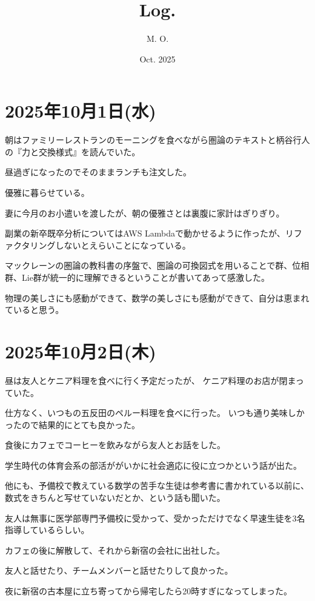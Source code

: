 \documentclass[uplatex]{jsarticle}
\title{
Log.
}
\author{
M. O.
}
\date{Oct. 2025}
\begin{document}
\maketitle

\section{2025年10月1日(水)}

朝はファミリーレストランのモーニングを食べながら圏論のテキストと柄谷行人の『力と交換様式』を読んでいた。

昼過ぎになったのでそのままランチも注文した。

優雅に暮らせている。

妻に今月のお小遣いを渡したが、朝の優雅さとは裏腹に家計はぎりぎり。

副業の新卒既卒分析についてはAWS Lambdaで動かせるように作ったが、リファクタリングしないとえらいことになっている。

マックレーンの圏論の教科書の序盤で、圏論の可換図式を用いることで群、位相群、Lie群が統一的に理解できるということが書いてあって感激した。

物理の美しさにも感動ができて、数学の美しさにも感動ができて、自分は恵まれていると思う。





\section{2025年10月2日(木)}

昼は友人とケニア料理を食べに行く予定だったが、
ケニア料理のお店が閉まっていた。

仕方なく、いつもの五反田のペルー料理を食べに行った。
いつも通り美味しかったので結果的にとても良かった。

食後にカフェでコーヒーを飲みながら友人とお話をした。

学生時代の体育会系の部活ががいかに社会適応に役に立つかという話が出た。

他にも、予備校で教えている数学の苦手な生徒は参考書に書かれている以前に、数式をきちんと写せていないだとか、という話も聞いた。

友人は無事に医学部専門予備校に受かって、受かっただけでなく早速生徒を3名指導しているらしい。

カフェの後に解散して、それから新宿の会社に出社した。

友人と話せたり、チームメンバーと話せたりして良かった。

夜に新宿の古本屋に立ち寄ってから帰宅したら20時すぎになってしまった。
\end{document}
